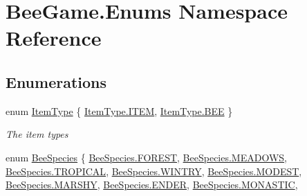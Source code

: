 \hypertarget{namespace_bee_game_1_1_enums}{}\section{Bee\+Game.\+Enums Namespace Reference}
\label{namespace_bee_game_1_1_enums}
\subsection*{Enumerations}
\begin{DoxyCompactItemize}
\item 
enum \hyperlink{namespace_bee_game_1_1_enums_aa1fa1a04627915b8e72d3bb1c5c3fa82}{Item\+Type} \{ \hyperlink{namespace_bee_game_1_1_enums_aa1fa1a04627915b8e72d3bb1c5c3fa82a2b911c015ed17a423c74ab9987330e60}{Item\+Type.\+I\+T\+EM}, 
\hyperlink{namespace_bee_game_1_1_enums_aa1fa1a04627915b8e72d3bb1c5c3fa82a24af484e92082ad450a63a69f924f10a}{Item\+Type.\+B\+EE}
 \}\begin{DoxyCompactList}\small\item\em The item types \end{DoxyCompactList}
\item 
enum \hyperlink{namespace_bee_game_1_1_enums_aa2ead984825678d83c42d48f6382619c}{Bee\+Species} \{ \newline
\hyperlink{namespace_bee_game_1_1_enums_aa2ead984825678d83c42d48f6382619ca1868c2177fdc84d496f7784a23729d3b}{Bee\+Species.\+F\+O\+R\+E\+ST}, 
\hyperlink{namespace_bee_game_1_1_enums_aa2ead984825678d83c42d48f6382619cac9012ad3d12ac6e61b88f2871ae8984e}{Bee\+Species.\+M\+E\+A\+D\+O\+WS}, 
\hyperlink{namespace_bee_game_1_1_enums_aa2ead984825678d83c42d48f6382619cab2ef5f527a20dd2b0b0c4642685e1d1d}{Bee\+Species.\+T\+R\+O\+P\+I\+C\+AL}, 
\hyperlink{namespace_bee_game_1_1_enums_aa2ead984825678d83c42d48f6382619cab20dce50bacb833125b1c5cace0e8768}{Bee\+Species.\+W\+I\+N\+T\+RY}, 
\newline
\hyperlink{namespace_bee_game_1_1_enums_aa2ead984825678d83c42d48f6382619ca68a19b5ff536b017119a2dd44403b5fc}{Bee\+Species.\+M\+O\+D\+E\+ST}, 
\hyperlink{namespace_bee_game_1_1_enums_aa2ead984825678d83c42d48f6382619cab3dd49c780bfda9918403c9a4ccd4424}{Bee\+Species.\+M\+A\+R\+S\+HY}, 
\hyperlink{namespace_bee_game_1_1_enums_aa2ead984825678d83c42d48f6382619ca0d800016e1f76067cbc36701dd6c7609}{Bee\+Species.\+E\+N\+D\+ER}, 
\hyperlink{namespace_bee_game_1_1_enums_aa2ead984825678d83c42d48f6382619cacb30e522c4cde1b069a596b8a501800e}{Bee\+Species.\+M\+O\+N\+A\+S\+T\+IC}, 
\newline

\end{DoxyCompactItemize}
